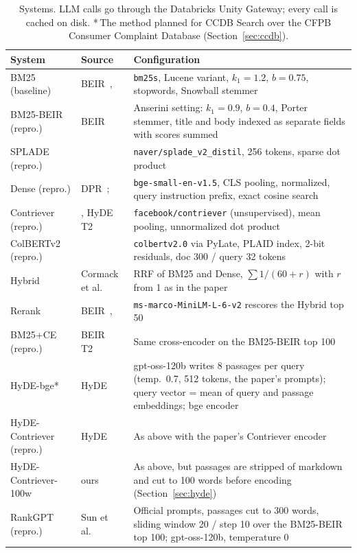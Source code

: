 \documentclass[11pt]{article}
\begin{document}
\begin{table}[H]\centering\small
\caption{Systems. LLM calls go through the Databricks Unity Gateway; every call is cached on disk. *\,The method planned for CCDB Search over the CFPB Consumer Complaint Database (Section~\ref{sec:ccdb}).}\label{tab:sys}
\begin{tabularx}{\linewidth}{>{\raggedright\arraybackslash}p{2.7cm}>{\raggedright\arraybackslash}p{2.6cm}X}\toprule
System & Source & Configuration\\\midrule
BM25 (baseline) & BEIR~\cite{thakur2021beir}, \cite{kamphuis2020bm25} & \texttt{bm25s}, Lucene variant, $k_1{=}1.2$, $b{=}0.75$, stopwords, Snowball stemmer\\
BM25-BEIR (repro.) & BEIR~\cite{thakur2021beir} & Anserini setting: $k_1{=}0.9$, $b{=}0.4$, Porter stemmer, title and body indexed as separate fields with scores summed\\
SPLADE (repro.) & \cite{formal2021splade,formal2021spladev2} & \texttt{naver/splade\_v2\_distil}, 256 tokens, sparse dot product\\
Dense (repro.) & DPR~\cite{karpukhin2020dpr}; \cite{xiao2023cpack,bge2023card} & \texttt{bge-small-en-v1.5}, CLS pooling, normalized, query instruction prefix, exact cosine search\\
Contriever (repro.) & \cite{izacard2022contriever}, HyDE T2~\cite{gao2023hyde} & \texttt{facebook/contriever} (unsupervised), mean pooling, unnormalized dot product\\
ColBERTv2 (repro.) & \cite{khattab2020colbert,santhanam2022colbertv2,santhanam2022plaid} & \texttt{colbertv2.0} via PyLate, PLAID index, 2-bit residuals, doc 300 / query 32 tokens\\
Hybrid & Cormack et al.~\cite{cormack2009rrf} & RRF of BM25 and Dense, $\sum 1/(60+r)$ with $r$ from 1 as in the paper\\
Rerank & BEIR~\cite{thakur2021beir}, \cite{wang2020minilm} & \texttt{ms-marco-MiniLM-L-6-v2} rescores the Hybrid top 50\\
BM25+CE (repro.) & BEIR T2~\cite{thakur2021beir} & Same cross-encoder on the BM25-BEIR top 100\\
HyDE-bge* & HyDE~\cite{gao2023hyde} & gpt-oss-120b writes 8 passages per query (temp.\ 0.7, 512 tokens, the paper's prompts); query vector = mean of query and passage embeddings; bge encoder\\
HyDE-Contriever (repro.) & HyDE~\cite{gao2023hyde} & As above with the paper's Contriever encoder\\
HyDE-Contriever-100w & ours & As above, but passages are stripped of markdown and cut to 100 words before encoding (Section~\ref{sec:hyde})\\
RankGPT (repro.) & Sun et al.~\cite{sun2023rankgpt} & Official prompts, passages cut to 300 words, sliding window 20 / step 10 over the BM25-BEIR top 100; gpt-oss-120b, temperature 0\\
\bottomrule\end{tabularx}
\end{table}
\end{document}
